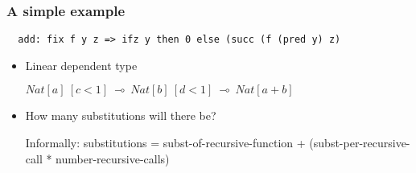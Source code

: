 \documentclass{beamer}
\begin{document}
\begin{frame}[fragile]
\frametitle{A simple example}
\begin{verbatim}
  add: fix f y z => ifz y then 0 else (succ (f (pred y) z)
\end{verbatim}
\begin{itemize}
\item Linear dependent type 

  $Nat[a]~[c < 1]~\multimap~Nat[b]~[d < 1]~\multimap~Nat[a + b]$

\item  How many substitutions will there be? 

  Informally: substitutions = subst-of-recursive-function +
  (subst-per-recursive-call * number-recursive-calls)

\end{itemize}
\end{frame}
\end{document}
